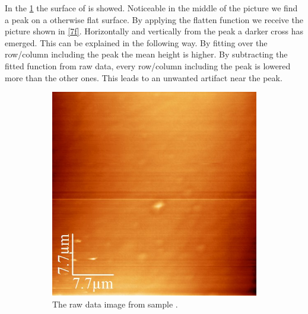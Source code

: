 \documentclass[paper=a4,fontsize=10pt,DIV=18,twocolumn,parskip=half]{scrartcl}
\numberwithin{equation}{section}    %
\begin{document}
In the \ref{7} the surface of  is showed. Noticeable in the 
middle of the picture we find a peak on a otherwise flat surface. By applying 
the flatten function we receive the picture shown in \ref{7f}. Horizontally and 
vertically from the peak a darker cross has emerged. This can be explained in 
the following way. By fitting over the row/column including the peak the mean 
height is higher. By subtracting the fitted function from raw data, every 
row/column including the peak is lowered more than the other ones. This leads to 
an unwanted artifact near the peak.
\begin{figure}
    \centering
    \begin{subfigure}[t]{0.45\columnwidth}
        \includegraphics[width=\columnwidth]{Bilder/1}
        \caption{The raw data image from sample . }
        \label{7}
    \end{subfigure}
    ~
    \begin{subfigure}[t]{0.45\columnwidth}

\end{subfigure}
\end{figure}
\end{document}
